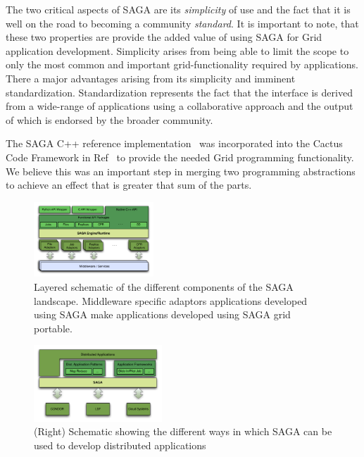 \documentclass[conference,final]{IEEEtran}
\begin{document}
The two critical aspects of SAGA are its {\it simplicity} of use and
the fact that it is well on the road to becoming a community {\it
  standard}.  It is important to note, that these two properties are
provide the added value of using SAGA for Grid application
development.  Simplicity arises from being able to limit the scope to
only the most common and important grid-functionality required by
applications.  There a major advantages arising from its simplicity
and imminent standardization.  Standardization represents the fact
that the interface is derived from a wide-range of applications using
a collaborative approach and the output of which is endorsed by the
broader community.

The SAGA C++ reference implementation~\cite{saga_web} was incorporated
into the Cactus Code Framework in Ref~\cite{escience07} to provide the
needed Grid programming functionality.  We believe this was an
important step in merging two programming abstractions to achieve an
effect that is greater that sum of the parts. 


\begin{figure}[!ht]
  \begin{center}
      \includegraphics[width=0.40\textwidth]{stci_saga_figures-1.pdf}
  \end{center}
  \caption{\small Layered schematic of the different components
    of the SAGA landscape.  Middleware specific adaptors applications
    developed using SAGA make applications developed using SAGA grid
    portable.}
 \label{sagalayer}
\end{figure}

\begin{figure}[!ht]
  \begin{center}
\includegraphics[width=0.43\textwidth]{saga_platform_figures.pdf}
\end{center}
  \caption{\small(Right) Schematic showing the different ways in which
    SAGA can be used to develop distributed applications}
 \label{sagapps}
\end{figure}
\end{document}

